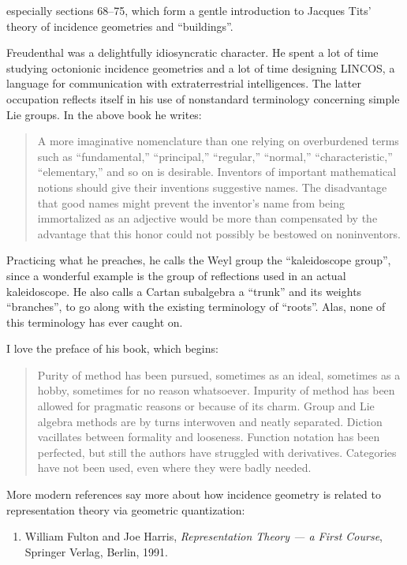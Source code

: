 \documentclass{article}
\def\tightlist{}
\begin{document}
especially sections 68--75, which form a gentle introduction to Jacques
Tits' theory of incidence geometries and ``buildings''.

Freudenthal was a delightfully idiosyncratic character. He spent a lot
of time studying octonionic incidence geometries and a lot of time
designing LINCOS, a language for communication with extraterrestrial
intelligences. The latter occupation reflects itself in his use of
nonstandard terminology concerning simple Lie groups. In the above book
he writes:

\begin{quote}
A more imaginative nomenclature than one relying on overburdened terms
such as ``fundamental,'' ``principal,'' ``regular,'' ``normal,''
``characteristic,'' ``elementary,'' and so on is desirable. Inventors of
important mathematical notions should give their inventions suggestive
names. The disadvantage that good names might prevent the inventor's
name from being immortalized as an adjective would be more than
compensated by the advantage that this honor could not possibly be
bestowed on noninventors.
\end{quote}

Practicing what he preaches, he calls the Weyl group the ``kaleidoscope
group'', since a wonderful example is the group of reflections used in
an actual kaleidoscope. He also calls a Cartan subalgebra a ``trunk''
and its weights ``branches'', to go along with the existing terminology
of ``roots''. Alas, none of this terminology has ever caught on.

I love the preface of his book, which begins:

\begin{quote}
Purity of method has been pursued, sometimes as an ideal, sometimes as a
hobby, sometimes for no reason whatsoever. Impurity of method has been
allowed for pragmatic reasons or because of its charm. Group and Lie
algebra methods are by turns interwoven and neatly separated. Diction
vacillates between formality and looseness. Function notation has been
perfected, but still the authors have struggled with derivatives.
Categories have not been used, even where they were badly needed.
\end{quote}

More modern references say more about how incidence geometry is related
to representation theory via geometric quantization:

\begin{enumerate}
\def\labelenumi{\arabic{enumi})}
\setcounter{enumi}{7}
\tightlist
\item
  William Fulton and Joe Harris, \emph{Representation Theory --- a First
  Course}, Springer Verlag, Berlin, 1991.
\end{enumerate}
\end{document}
